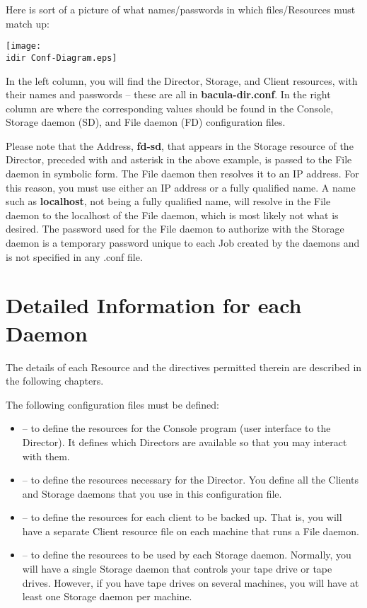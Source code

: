 Here is sort of a picture of what names/passwords in which files/Resources
must match up: 

\texttt{[image: \\idir Conf-Diagram.eps]} 

In the left column, you will find the Director, Storage, and Client resources,
with their names and passwords -- these are all in {\bf bacula-dir.conf}. In
the right column are where the corresponding values should be found in the
Console, Storage daemon (SD), and File daemon (FD) configuration files. 

Please note that the Address, {\bf fd-sd}, that appears in the Storage
resource of the Director, preceded with and asterisk in the above example, is
passed to the File daemon in symbolic form. The File daemon then resolves it
to an IP address. For this reason, you must use either an IP address or a
fully qualified name. A name such as {\bf localhost}, not being a fully
qualified name, will resolve in the File daemon to the localhost of the File
daemon, which is most likely not what is desired. The password used for the
File daemon to authorize with the Storage daemon is a temporary password
unique to each Job created by the daemons and is not specified in any .conf
file. 

\section{Detailed Information for each Daemon}

The details of each Resource and the directives permitted therein are
described in the following chapters. 

The following configuration files must be defined: 

\begin{itemize}
\item 
    -- to define the resources for 
   the Console program (user interface to the Director).  It defines which
Directors are  available so that you may interact with them. 
\item 
    -- to define the resources 
   necessary for the Director. You define all the Clients  and Storage daemons
that you use in this configuration file.  
\item 
    -- to define the resources for 
   each client to be backed up. That is, you will have a separate  Client
resource file on each machine that runs a File daemon. 
\item 
    -- to define the resources to 
   be used by each Storage daemon. Normally, you will have  a single Storage
daemon that controls your tape drive or tape  drives. However, if you have
tape drives on several machines,  you will have at least one Storage daemon
per machine.  
\end{itemize}
